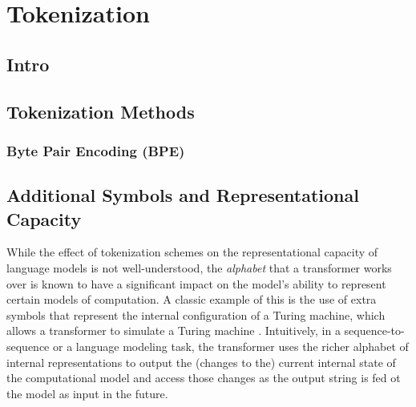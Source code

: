%
\chapter{Tokenization}
%

\section{Intro}


\section{Tokenization Methods}

\subsection{Byte Pair Encoding (BPE)}


\section{Additional Symbols and Representational Capacity}

While the effect of tokenization schemes on the representational capacity of language models is not well-understood, the \emph{alphabet} that a transformer works over is known to have a significant impact on the model's ability to represent certain models of computation.
A classic example of this is the use of extra symbols that represent the internal configuration of a Turing machine, which allows a transformer to simulate a Turing machine \citep{perez-etal-2021-turing}.
Intuitively, in a sequence-to-sequence or a language modeling task, the transformer uses the richer alphabet of internal representations to output the (changes to the) current internal state of the computational model and access those changes as the output string is fed ot the model as input in the future.

